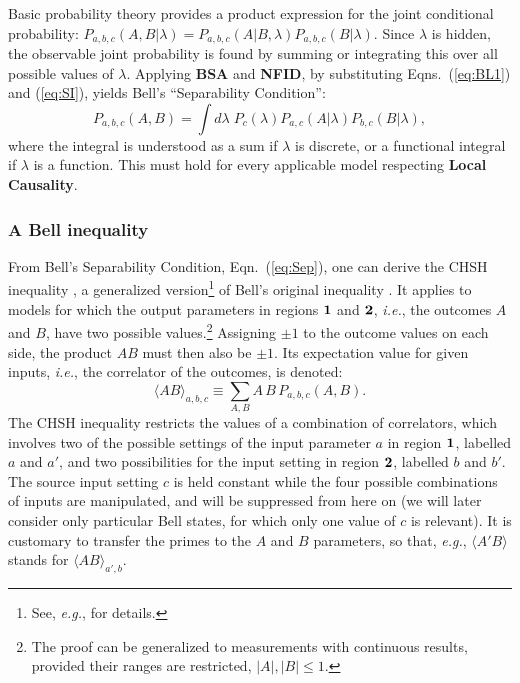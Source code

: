 \documentclass[onecolumn, nofootinbib, 12pt]{revtex4-1}
\begin{document}
Basic probability theory provides a product expression for the joint conditional probability: 
$P_{a,b,c}(A,B|\lambda)=P_{a,b,c}(A|B,\lambda)P_{a,b,c}(B|\lambda)$.  Since $\lambda$ is hidden, the observable joint probability is found by summing or integrating this over all possible values of $\lambda$.  Applying {\bf BSA} and {\bf NFID}, by substituting Eqns.~(\ref{eq:BL1}) and (\ref{eq:SI}), yields Bell's ``Separability Condition'':
\begin{equation}
\label{eq:Sep}
P_{a,b,c}(A,B) = \int d\lambda \; P_{c}(\lambda) P_{a,c}(A|\lambda) P_{b,c}(B|\lambda),
\end{equation}
where the integral is understood as a sum if $\lambda$ is discrete, or a functional integral if $\lambda$ is a function.  This must hold for every applicable model respecting {\bf Local Causality}.

\subsubsection{A Bell inequality}
\label{sec:CHSH}

From Bell's Separability Condition, Eqn.~(\ref{eq:Sep}), one can derive the CHSH inequality \cite{clauser1969}, a generalized version\footnote{See, \textit{e.g.}, \textcite{bell1971} for details.} of Bell's original inequality \cite{bell1964}.  It applies to models for which the output parameters in regions $\bf{1}$ and $\bf{2}$, \textit{i.e.}, the outcomes $A$ and $B$, have two possible values.\footnote{
The proof can be generalized to measurements with continuous results, provided their ranges are restricted, $|A|,|B| \leq 1$.}  
Assigning $\pm 1$ to the outcome values on each side, the product $AB$ must then also be $\pm 1$.  Its expectation value for given inputs, \textit{i.e.}, the correlator of the outcomes, is denoted:
\begin{equation}
\label{eq:correlation}
\langle A B \rangle_{a,b,c}\equiv \sum_{A,B} A \, B \, P_{a,b,c}(A,B).
\end{equation}
The CHSH inequality restricts the values of a combination of correlators, which involves two of the possible settings of the input parameter $a$ in region $\bf{1}$, labelled $a$ and $a'$, and two possibilities for the input setting in region $\bf{2}$, labelled $b$ and $b'$.  The source input setting $c$ is held constant while the four possible combinations of inputs are manipulated, and will be suppressed from here on (we will later consider only particular Bell states, for which only one value of $c$ is relevant).  
It is customary to transfer the primes to the $A$ and $B$ parameters, so that, \emph{e.g.}, $\langle A' B \rangle$ stands for $\langle  A B \rangle_{a',b}$.
\end{document}
